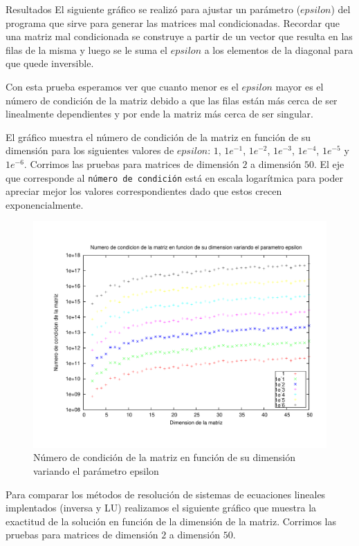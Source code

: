\begin{section}{Resultados}
	El siguiente gráfico se realizó para ajustar un parámetro ($epsilon$) del programa que sirve para generar las matrices mal condicionadas. Recordar que una matriz mal condicionada se construye a partir de un vector que resulta en las filas de la misma y luego se le suma el $epsilon$ a los elementos de la diagonal para que quede inversible.
	
	Con esta prueba esperamos ver que cuanto menor es el $epsilon$ mayor es el número de condición de la matriz debido a que las filas están más cerca de ser linealmente dependientes y por ende la matriz más cerca de ser singular.

	El gráfico muestra el número de condición de la matriz en función de su dimensión para los siguientes valores de $epsilon$: $1$, $1e^{-1}$, $1e^{-2}$, $1e^{-3}$, $1e^{-4}$, $1e^{-5}$ y $1e^{-6}$. Corrimos las pruebas para matrices de dimensión $2$ a dimensión $50$.
	El eje que corresponde al \texttt{número de condición} está en escala logarítmica para poder apreciar mejor los valores correspondientes dado que estos crecen exponencialmente.

	\begin{figure}[H]
	  \centering
		\includegraphics[width=14cm]{graficos/ajuste_epsilon.pdf}
	  \caption{Número de condición de la matriz en función de su dimensión variando el parámetro epsilon}
	  \label{fig:epsilon}
	\end{figure}
	
	\VSP
	
	Para comparar los métodos de resolución de sistemas de ecuaciones lineales implentados (inversa y LU) realizamos el siguiente gráfico que muestra la exactitud de la solución en función de la dimensión de la matriz. Corrimos las pruebas para matrices de dimensión $2$ a dimensión $50$.
	

\end{section}
